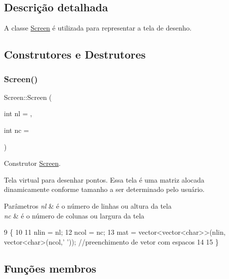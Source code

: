 \subsection{Descrição detalhada}
A classe \mbox{\hyperlink{class_screen}{Screen}} é utilizada para representar a tela de desenho. 

\subsection{Construtores e Destrutores}
\mbox{\label{class_screen_a4f0097a240880bbf75242dd0938d7f38}} 
\subsubsection{\texorpdfstring{Screen()}{Screen()}}
{\footnotesize\ttfamily Screen\+::\+Screen (\begin{DoxyParamCaption}\item[{int}]{nl = {},  }\item[{int}]{nc = {} }\end{DoxyParamCaption})}



Construtor \mbox{\hyperlink{class_screen}{Screen}}. 

Tela virtual para desenhar pontos. Essa tela é uma matriz alocada dinamicamente conforme tamanho a ser determinado pelo usuário. 
\begin{DoxyParams}{Parâmetros}
{\em nl} & é o número de linhas ou altura da tela \\
\hline
{\em nc} & é o número de colunas ou largura da tela \\
\hline
\end{DoxyParams}

\begin{DoxyCode}
9                             \{
10 
11     nlin = nl;
12     ncol = nc;
13     mat = vector<vector<char>>(nlin, vector<char>(ncol,\textcolor{charliteral}{' '})); \textcolor{comment}{//preenchimento de vetor com espacos}
14 
15 \}
\end{DoxyCode}


\subsection{Funções membros}
\mbox{\label{class_screen_a35e74266b2a04e37b354ceff7a5f1031}} 
